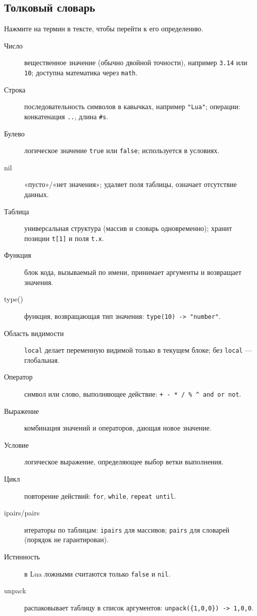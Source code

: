 \subsection{Толковый словарь}
Нажмите на термин в тексте, чтобы перейти к его определению.
\begin{description}
  \item[\hypertarget{term:number}{Число}] вещественное значение (обычно двойной точности), например \verb|3.14| или \verb|10|; доступна математика через \verb|math|.
  \item[\hypertarget{term:string}{Строка}] последовательность символов в кавычках, например \verb|"Lua"|; операции: конкатенация \verb|..|, длина \verb|#s|.
  \item[\hypertarget{term:boolean}{Булево}] логическое значение \verb|true| или \verb|false|; используется в условиях.
  \item[\hypertarget{term:nil}{nil}] «пусто»/«нет значения»; удаляет поля таблицы, означает отсутствие данных.
  \item[\hypertarget{term:table}{Таблица}] универсальная структура (массив и словарь одновременно); хранит позиции \verb|t[1]| и поля \verb|t.x|.
  \item[\hypertarget{term:function}{Функция}] блок кода, вызываемый по имени, принимает аргументы и возвращает значения.
  \item[\hypertarget{term:type}{type()}] функция, возвращающая тип значения: \verb|type(10) -> "number"|.
  \item[\hypertarget{term:scope}{Область видимости}] \verb|local| делает переменную видимой только в текущем блоке; без \verb|local| — глобальная.
  \item[\hypertarget{term:operator}{Оператор}] символ или слово, выполняющее действие: \verb|+ - * / % ^ and or not|.
  \item[\hypertarget{term:expression}{Выражение}] комбинация значений и операторов, дающая новое значение.
  \item[\hypertarget{term:condition}{Условие}] логическое выражение, определяющее выбор ветки выполнения.
  \item[\hypertarget{term:loop}{Цикл}] повторение действий: \verb|for|, \verb|while|, \verb|repeat until|.
  \item[\hypertarget{term:ipairs}{ipairs/pairs}] итераторы по таблицам: \verb|ipairs| для массивов; \verb|pairs| для словарей (порядок не гарантирован).
  \item[\hypertarget{term:truthiness}{Истинность}] в Lua ложными считаются только \verb|false| и \verb|nil|.
  \item[\hypertarget{term:unpack}{unpack}] распаковывает таблицу в список аргументов: \verb|unpack({1,0,0}) -> 1,0,0|.
\end{description}

